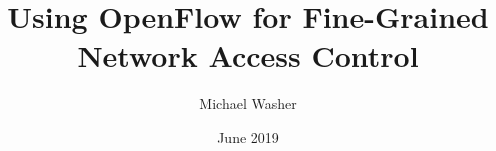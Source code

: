 \documentclass[12pt]{latex_items/uwthesis17}
\title{Using OpenFlow for Fine-Grained Network Access Control}
\author{Michael Washer}
\date{June 2019}
\begin{document}
\maketitle

\setcounter{secnumdepth}{3}
\begin{abstract}

\end{abstract}

\begin{acknowledgements}

\end{acknowledgements}

\tableofcontents
\newpage
{}
\setcounter{page}{1}














\nocite{*}
\end{document}
